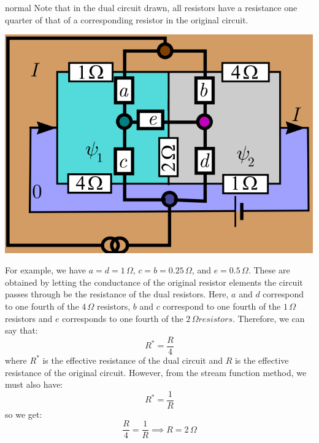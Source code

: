 \begin{solution}{normal}
Note that in the dual circuit drawn, all resistors have a resistance one quarter of that of a corresponding resistor in the original circuit.
\begin{center}
    \includegraphics[width=0.6\linewidth]{Figures/pr15_sol.PNG}
\end{center}
For example, we have $a=d=1\,\Omega$, $c=b=0.25\,\Omega$, and $e=0.5\,\Omega$. These are obtained by letting the conductance of the original resistor elements the circuit passes through be the resistance of the dual resistors. Here, $a$ and $d$ correspond to one fourth of the $4\,\Omega$ resistors, $b$ and $c$ correspond to one fourth of the $1\,\Omega$ resistors and $e$ corresponds to one fourth of the $2\,\Omega resistors$. Therefore, we can say that:
$$R^* = \frac{R}{4}$$
where $R^*$ is the effective resistance of the dual circuit and $R$ is the effective resistance of the original circuit. However, from the stream function method, we must also have:
$$R^* = \frac{1}{R}$$
so we get:
$$\frac{R}{4}=\frac{1}{R} \implies \boxed{R=2\,\Omega}$$
\end{solution}